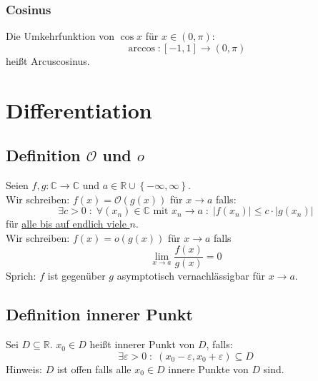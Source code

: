 \documentclass[halfparscip]{scrartcl}
\newcounter{subsection2}
\begin{document}
\subsubsection*{Cosinus}
Die Umkehrfunktion von $\cos x$ für $x \in \left(0,\pi\right)$:
\begin{equation*}
\arccos : \left[-1,1\right] \rightarrow \left(0,\pi\right)
\end{equation*}
heißt Arcuscosinus.\\

\newpage
\section{Differentiation}
\subsection{Definition $\mathcal{O}$ und $o$}
Seien $f,g : \mathbb{C} \rightarrow \mathbb{C}$ und $a \in \mathbb{R} \cup \left\{-\infty, \infty\right\}$.\\
Wir schreiben: $f(x) = \mathcal{O}(g(x))$ für $x \rightarrow a$ falls:
\begin{equation*}
	\exists c > 0 \;:\; \forall (x_n) \in \mathbb{C} \text{ mit } x_n \rightarrow a \;:\; \left|f(x_n)\right| \leq c \cdot \left|g(x_n)\right|
\end{equation*}
für \underline{alle bis auf endlich viele $n$}.\\
Wir schreiben: $f(x) = o(g(x))$ für $x \rightarrow a$ falls
\begin{equation*}
	\lim_{x\rightarrow a}\frac{f(x)}{g(x)} = 0
\end{equation*}
Sprich: \glqq{}$f$ ist gegenüber $g$ asymptotisch vernachlässigbar für $x \rightarrow a$.\grqq

\subsection{Definition innerer Punkt}
Sei $D \subseteq \mathbb{R}$. $x_0 \in D$ heißt innerer Punkt von $D$, falls:
\begin{equation*}
	\exists \varepsilon > 0 \;:\; (x_0 - \varepsilon, x_0 + \varepsilon) \subseteq D
\end{equation*}
Hinweis: $D$ ist offen falls alle $x_0 \in D$ innere Punkte von $D$ sind.
\end{document}
